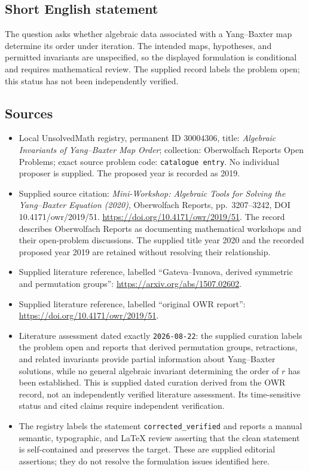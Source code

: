 \documentclass[11pt]{article}
\begin{document}
\subsection{Short English statement}
The question asks whether algebraic data associated with a Yang--Baxter map determine its order under iteration. The intended maps, hypotheses, and permitted invariants are unspecified, so the displayed formulation is conditional and requires mathematical review. The supplied record labels the problem open; this status has not been independently verified.
\subsection{Sources}
\begin{itemize}
\item Local UnsolvedMath registry, permanent ID \(30004306\), title: \emph{Algebraic Invariants of Yang--Baxter Map Order}; collection: Oberwolfach Reports Open Problems; exact source problem code: \texttt{catalogue entry}. No individual proposer is supplied. The proposed year is recorded as 2019.
\item Supplied source citation: \emph{Mini-Workshop: Algebraic Tools for Solving the Yang--Baxter Equation (2020)}, Oberwolfach Reports, pp.~3207--3242, DOI 10.4171/owr/2019/51. \url{https://doi.org/10.4171/owr/2019/51}. The record describes Oberwolfach Reports as documenting mathematical workshops and their open-problem discussions. The supplied title year 2020 and the recorded proposed year 2019 are retained without resolving their relationship.
\item Supplied literature reference, labelled ``Gateva--Ivanova, derived symmetric and permutation groups'': \url{https://arxiv.org/abs/1507.02602}.
\item Supplied literature reference, labelled ``original OWR report'': \url{https://doi.org/10.4171/owr/2019/51}.
\item Literature assessment dated exactly \texttt{2026-08-22}: the supplied curation labels the problem open and reports that derived permutation groups, retractions, and related invariants provide partial information about Yang--Baxter solutions, while no general algebraic invariant determining the order of \(r\) has been established. This is supplied dated curation derived from the OWR record, not an independently verified literature assessment. Its time-sensitive status and cited claims require independent verification.
\item The registry labels the statement \texttt{corrected\_verified} and reports a manual semantic, typographic, and LaTeX review asserting that the clean statement is self-contained and preserves the target. These are supplied editorial assertions; they do not resolve the formulation issues identified here.
\end{itemize}
\end{document}
